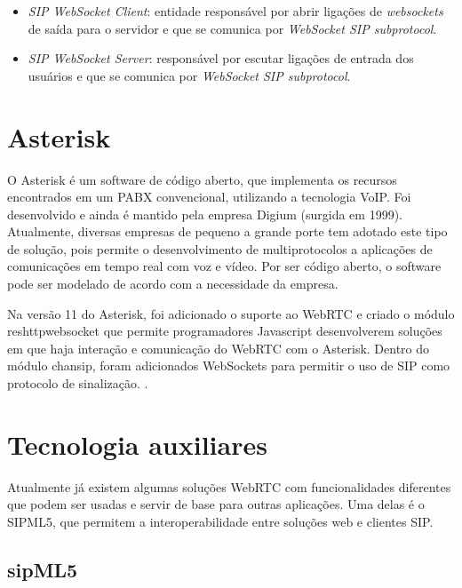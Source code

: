 \documentclass[ruledheader]{abnt} %
\begin{document}
\begin{itemize}
  \item \textit{SIP WebSocket Client}: entidade responsável por abrir ligações de \textit{websockets} de saída para o servidor e que se comunica por \textit{WebSocket SIP subprotocol}.
  \item \textit{SIP WebSocket Server}: responsável por escutar ligações de entrada dos usuários e que se comunica por \textit{WebSocket SIP subprotocol}.
\end{itemize}


\section{Asterisk}
\label{s_asterisk}
O Asterisk é um software de código aberto, que implementa os recursos encontrados em um PABX convencional, utilizando a tecnologia VoIP. Foi desenvolvido e ainda é mantido pela empresa Digium (surgida em 1999). 
Atualmente, diversas empresas de pequeno a grande porte tem adotado este tipo de solução, pois permite o desenvolvimento de multiprotocolos a aplicações de comunicações em tempo real com voz e vídeo. Por ser código aberto, o software pode ser modelado de acordo com a necessidade da empresa.

Na versão 11 do Asterisk, foi adicionado o suporte ao WebRTC e criado o módulo res\underline{\hspace{.10in}}http\underline{\hspace{.10in}}websocket que permite programadores Javascript desenvolverem soluções em que haja interação e comunicação do WebRTC com o Asterisk. Dentro do módulo chan\underline{\hspace{.10in}}sip, foram adicionados WebSockets para permitir o uso de SIP como protocolo de sinalização. \cite{Amaral:2013}.

\section{Tecnologia auxiliares}
\label{s_tecAuxiliares}
Atualmente já existem algumas soluções WebRTC com funcionalidades diferentes que podem ser usadas e servir de base para outras aplicações. Uma delas é o SIPML5, que permitem a interoperabilidade entre soluções web e clientes SIP. 


\subsection{sipML5}
\label{ss_sipml5}
\end{document}
